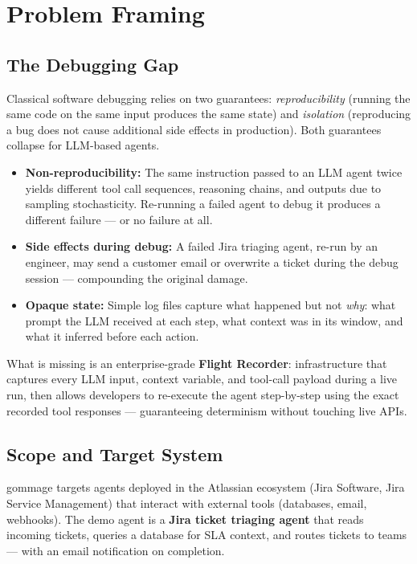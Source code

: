\documentclass[11pt, a4paper]{article}
\begin{document}
\vspace{1cm}
\tableofcontents
\newpage

\section{Problem Framing}

\subsection{The Debugging Gap}

Classical software debugging relies on two guarantees: \textit{reproducibility} (running the same code on the same input produces the same state) and \textit{isolation} (reproducing a bug does not cause additional side effects in production). Both guarantees collapse for LLM-based agents.

\begin{itemize}[leftmargin=1.5em, itemsep=0.3em]
  \item \textbf{Non-reproducibility:} The same instruction passed to an LLM agent twice yields different tool call sequences, reasoning chains, and outputs due to sampling stochasticity. Re-running a failed agent to debug it produces a different failure — or no failure at all.
  \item \textbf{Side effects during debug:} A failed Jira triaging agent, re-run by an engineer, may send a customer email or overwrite a ticket during the debug session — compounding the original damage.
  \item \textbf{Opaque state:} Simple log files capture what happened but not \textit{why}: what prompt the LLM received at each step, what context was in its window, and what it inferred before each action.
\end{itemize}

What is missing is an enterprise-grade \textbf{Flight Recorder}: infrastructure that captures every LLM input, context variable, and tool-call payload during a live run, then allows developers to re-execute the agent step-by-step using the exact recorded tool responses — guaranteeing determinism without touching live APIs.

\subsection{Scope and Target System}
gommage targets agents deployed in the Atlassian ecosystem (Jira Software, Jira Service Management) that interact with external tools (databases, email, webhooks). The demo agent is a \textbf{Jira ticket triaging agent} that reads incoming tickets, queries a database for SLA context, and routes tickets to teams — with an email notification on completion.
\end{document}
